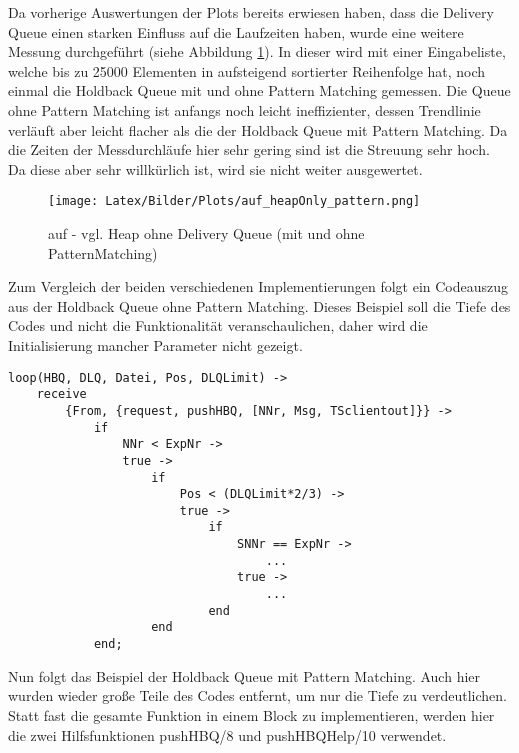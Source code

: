 Da vorherige Auswertungen der Plots bereits erwiesen haben, dass die Delivery Queue einen starken Einfluss auf die Laufzeiten haben, wurde eine weitere Messung durchgeführt (siehe Abbildung \ref{fig:auf_hbqOnly_pattern}). In dieser wird mit einer Eingabeliste, welche bis zu 25000 Elementen in aufsteigend sortierter Reihenfolge hat, noch einmal die Holdback Queue mit und ohne Pattern Matching gemessen. Die Queue ohne Pattern Matching ist anfangs noch leicht ineffizienter, dessen Trendlinie verläuft aber leicht flacher als die der Holdback Queue mit Pattern Matching. Da die Zeiten der Messdurchläufe hier sehr gering sind ist die Streuung sehr hoch. Da diese aber sehr willkürlich ist, wird sie nicht weiter ausgewertet.

\begin{figure}[htbp]
\begin{center}
\texttt{[image: Latex/Bilder/Plots/auf\_heapOnly\_pattern.png]}
\caption{\label{fig:auf_hbqOnly_pattern} auf - vgl. Heap ohne Delivery Queue (mit und ohne PatternMatching)} 
\end{center}
\end{figure}

Zum Vergleich der beiden verschiedenen Implementierungen folgt ein Codeauszug aus der Holdback Queue ohne Pattern Matching. Dieses Beispiel soll die Tiefe des Codes und nicht die Funktionalität veranschaulichen, daher wird die Initialisierung mancher Parameter nicht gezeigt. 

\begin{lstlisting}
loop(HBQ, DLQ, Datei, Pos, DLQLimit) ->
	receive
		{From, {request, pushHBQ, [NNr, Msg, TSclientout]}} ->
			if 
				NNr < ExpNr ->
				true ->
					if
						Pos < (DLQLimit*2/3) ->
						true -> 
							if
								SNNr == ExpNr ->
								    ...
								true ->									
									...
					        end
			        end
	        end;
\end{lstlisting}

Nun folgt das Beispiel der Holdback Queue mit Pattern Matching. Auch hier wurden wieder große Teile des Codes entfernt, um nur die Tiefe zu verdeutlichen. Statt fast die gesamte Funktion in einem Block zu implementieren, werden hier die zwei Hilfsfunktionen pushHBQ/8 und pushHBQHelp/10 verwendet. \\


